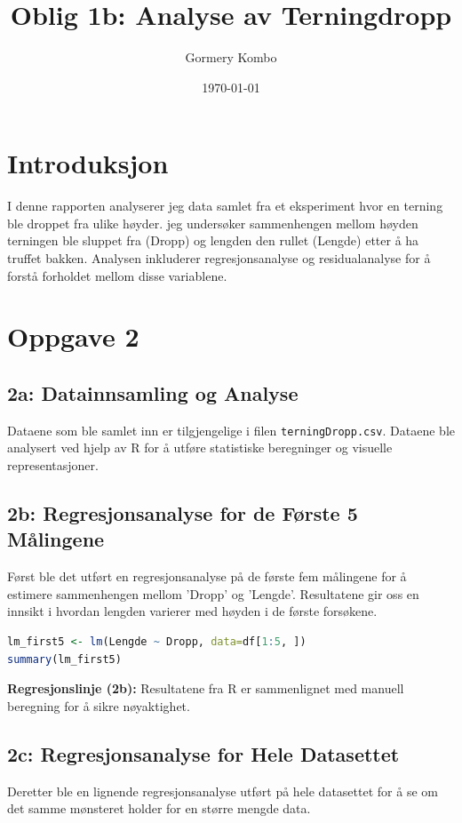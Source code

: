 \documentclass{article}
\title{Oblig 1b: Analyse av Terningdropp}
\author{Gormery Kombo}
\date{\today}
\begin{document}
\maketitle

\section{Introduksjon}
I denne rapporten analyserer jeg data samlet fra et eksperiment hvor en terning ble droppet fra ulike høyder. jeg undersøker sammenhengen mellom høyden terningen ble sluppet fra (Dropp) og lengden den rullet (Lengde) etter å ha truffet bakken. Analysen inkluderer regresjonsanalyse og residualanalyse for å forstå forholdet mellom disse variablene.

\section{Oppgave 2}
\subsection{2a: Datainnsamling og Analyse}
Dataene som ble samlet inn er tilgjengelige i filen \texttt{terningDropp.csv}. Dataene ble analysert ved hjelp av R for å utføre statistiske beregninger og visuelle representasjoner.

\subsection{2b: Regresjonsanalyse for de Første 5 Målingene}
Først ble det utført en regresjonsanalyse på de første fem målingene for å estimere sammenhengen mellom 'Dropp' og 'Lengde'. Resultatene gir oss en innsikt i hvordan lengden varierer med høyden i de første forsøkene.

\begin{lstlisting}[language=R]
lm_first5 <- lm(Lengde ~ Dropp, data=df[1:5, ])
summary(lm_first5)
\end{lstlisting}
\textbf{Regresjonslinje (2b):} Resultatene fra R er sammenlignet med manuell beregning for å sikre nøyaktighet.

\subsection{2c: Regresjonsanalyse for Hele Datasettet}
Deretter ble en lignende regresjonsanalyse utført på hele datasettet for å se om det samme mønsteret holder for en større mengde data.
\end{document}
